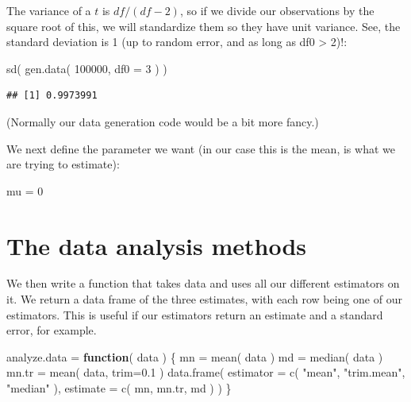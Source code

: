 \documentclass[
]{book}
\newenvironment{Shaded}{\begin{snugshade}}{\end{snugshade}}
\newcommand{\AttributeTok}[1]{\textcolor[rgb]{0.77,0.63,0.00}{#1}}
\newcommand{\ControlFlowTok}[1]{\textcolor[rgb]{0.13,0.29,0.53}{\textbf{#1}}}
\newcommand{\DecValTok}[1]{\textcolor[rgb]{0.00,0.00,0.81}{#1}}
\newcommand{\FloatTok}[1]{\textcolor[rgb]{0.00,0.00,0.81}{#1}}
\newcommand{\FunctionTok}[1]{\textcolor[rgb]{0.00,0.00,0.00}{#1}}
\newcommand{\NormalTok}[1]{#1}
\newcommand{\OtherTok}[1]{\textcolor[rgb]{0.56,0.35,0.01}{#1}}
\newcommand{\StringTok}[1]{\textcolor[rgb]{0.31,0.60,0.02}{#1}}
\begin{document}
The variance of a \(t\) is \(df/(df-2)\), so if we divide our observations by the
square root of this, we will standardize them so they have unit variance.
See, the standard deviation is 1 (up to random error, and as long as df0 \textgreater{}
2)!:

\begin{Shaded}
\begin{Highlighting}[]
\FunctionTok{sd}\NormalTok{( }\FunctionTok{gen.data}\NormalTok{( }\DecValTok{100000}\NormalTok{, }\AttributeTok{df0 =} \DecValTok{3}\NormalTok{ ) )}
\end{Highlighting}
\end{Shaded}

\begin{verbatim}
## [1] 0.9973991
\end{verbatim}

(Normally our data generation code would be a bit more fancy.)

We next define the parameter we want (in our case this is the mean, is what
we are trying to estimate):

\begin{Shaded}
\begin{Highlighting}[]
\NormalTok{mu }\OtherTok{=} \DecValTok{0}
\end{Highlighting}
\end{Shaded}

\hypertarget{the-data-analysis-methods}{%
\section{The data analysis methods}\label{the-data-analysis-methods}}

We then write a function that takes data and uses all our different
estimators on it. We return a data frame of the three estimates, with each
row being one of our estimators. This is useful if our estimators return an
estimate and a standard error, for example.

\begin{Shaded}
\begin{Highlighting}[]
\NormalTok{analyze.data }\OtherTok{=} \ControlFlowTok{function}\NormalTok{( data ) \{}
\NormalTok{    mn }\OtherTok{=} \FunctionTok{mean}\NormalTok{( data )}
\NormalTok{    md }\OtherTok{=} \FunctionTok{median}\NormalTok{( data )}
\NormalTok{    mn.tr }\OtherTok{=} \FunctionTok{mean}\NormalTok{( data, }\AttributeTok{trim=}\FloatTok{0.1}\NormalTok{ )}
    \FunctionTok{data.frame}\NormalTok{( }\AttributeTok{estimator =} \FunctionTok{c}\NormalTok{( }\StringTok{"mean"}\NormalTok{, }\StringTok{"trim.mean"}\NormalTok{, }\StringTok{"median"}\NormalTok{ ),}
                \AttributeTok{estimate =} \FunctionTok{c}\NormalTok{( mn, mn.tr, md ) )}
\NormalTok{\}}
\end{Highlighting}
\end{Shaded}
\end{document}
